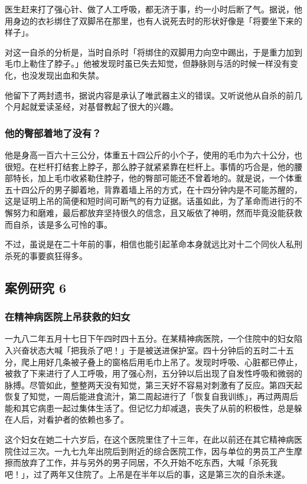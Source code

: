 \documentclass[UTF8]{ctexart}
\begin{document}
医生赶来打了强心针、做了人工呼吸，都无济于事，约一小时后断了气。据说，他用身边的衣衫绑住了双脚吊在那里，也有人说死去时的形状好像是「将要坐下来的样子」。

对这一自杀的分析是，当时自杀时「将绑住的双脚用力向空中踢出，于是重力加到毛巾上勒住了脖子。」他被发现时虽已失去知觉，但静脉则与活的时候一样没有变化，也没发现出血和失禁。

他留下了两封遗书，据说内容是承认了唯武器主义的错误。又听说他从自杀的前几个月起就爱读圣经，对基督教起了很大的兴趣。

\subsubsection*{他的臀部着地了没有？}

他是身高一百六十三公分，体重五十四公斤的小个子，使用的毛巾为六十公分，也很短。在栏杆打结套上脖子，那么脖子就紧紧靠在栏杆上。事情的巧合是，他的腰部特长，加上毛巾收紧勒住脖子，他的臀部可能还不曾着地的。就是说，一个体重五十四公斤的男子脚着地，背靠着墙上吊的方式，在十四分钟内是不可能苏醒的，这是证明上吊的简便和短时间可断气的有力证据。话虽如此，为了革命而进行的不懈努力和磨难，最后都放弃坚持很久的信念，且又皈依了神明，然而毕竟没能获救而自杀，该是多么可怜的事。

不过，虽说是在二十年前的事，相信也能引起革命本身就远比对十二个同伙人私刑杀死的事要疯狂得多。

\subsection{案例研究 6}
\subsubsection*{在精神病医院上吊获救的妇女}

一九八二年五月十七日下午四时四十五分。在某精神病医院，一个住院中的妇女陷入兴奋状态大喊「把我杀了吧！」于是被送进保护室。四十分钟后的五时二十五分，爬上用好几条被子叠上的窗格后用毛巾上吊了。发现时呼吸、心脏都已停止，被救了下来进行了人工呼吸，用了强心剂，五分钟以后出现了自发性呼吸和微弱的脉搏。尽管如此，整整两天没有知觉，第三天好不容易对刺激有了反应。第四天起恢复了知觉，一周后能进食流汁，第二周起进行了「恢复自我训练」，再过两周后能和其它病患一起过集体生活了。但记忆力却减退，丧失了从前的积极性，总是躲在人后，对看护者的依赖也多了。

这个妇女在她二十六岁后，在这个医院里住了十三年，在此以前还在其它精神病医院住过三次。一九七九年出院后到附近的综合医院工作，因与单位的男员工产生摩擦而放弃了工作，并与另外的男子同居，不久开始不吃东西，大喊「杀死我吧！」，过了两年又住院了。上吊是在半年以后的事，这是第三次的自杀未遂。
\end{document}
